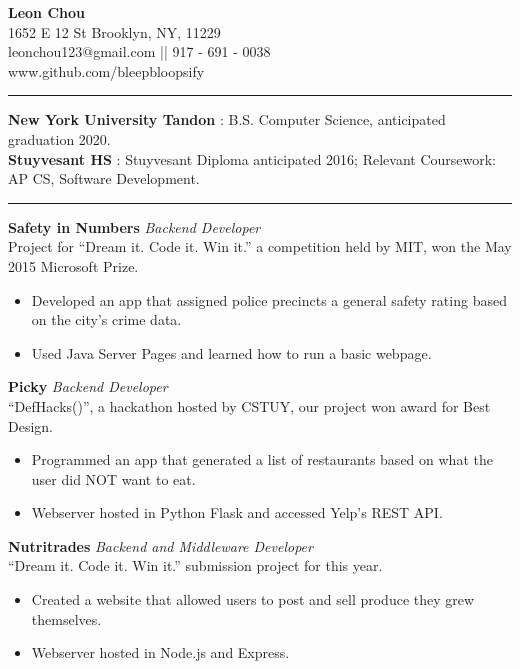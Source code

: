 \documentclass[14, .75in]{article}
\begin{document}
  \begin{center}
    \textbf{{\LARGE Leon Chou}}\\
    1652 E 12 St Brooklyn, NY, 11229 \\
    leonchou123@gmail.com || 917 - 691 - 0038\\ www.github.com/bleepbloopsify\\
  \end{center}
  \vspace{0.1cm} \hrule \vspace{0.3cm}
  \noindent\textbf{New York University Tandon} : B.S. Computer Science, anticipated graduation 2020.\\
  \textbf{Stuyvesant HS} : Stuyvesant Diploma anticipated 2016;
  Relevant Coursework: AP CS, Software Development.\\
  \vspace{0.1cm} \hrule \vspace{0.3cm}
  \noindent\textbf{Safety in Numbers}\textit{ Backend Developer}\\
  Project for ``Dream it. Code it. Win it.'' a competition held by MIT, won the May 2015 Microsoft Prize.
  \begin{itemize}[label={--},noitemsep, topsep=0pt]
    \item Developed an app that assigned police precincts a general safety rating based on the city's crime data.
    \item Used Java Server Pages and learned how to run a basic webpage.
  \end{itemize}
  \textbf{Picky}\textit{ Backend Developer}\\ ``DefHacks()'', a hackathon hosted by CSTUY, our project won award for Best Design.
  \begin{itemize}[label={--},noitemsep, topsep=0pt]
    \item Programmed an app that generated a list of restaurants based on what the user did NOT want to eat.
    \item Webserver hosted in Python Flask and accessed Yelp's REST API.
  \end{itemize}
  \textbf{Nutritrades}\textit{ Backend and Middleware Developer}\\
  ``Dream it. Code it. Win it.'' submission project for this year.
  \begin{itemize}[label={--},noitemsep, topsep=0pt]
    \item Created a website that allowed users to post and sell produce they grew themselves.
    \item Webserver hosted in Node.js and Express.
  \end{itemize}
\end{document}
